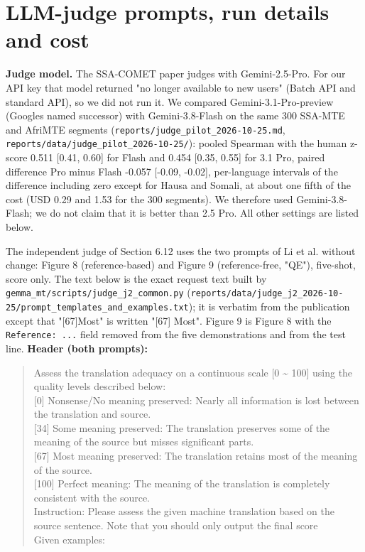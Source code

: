 \section{LLM-judge prompts, run details and cost}\label{llm-judge-prompts-run-details-and-cost}

\textbf{Judge model.} The SSA-COMET paper \citep{li2025ssacomet} judges with Gemini-2.5-Pro. For our API key that model returned "no longer available to new users" (Batch API and standard API), so we did not run it. We compared Gemini-3.1-Pro-preview (Google\textquotesingle s named successor) with Gemini-3.8-Flash on the same 300 SSA-MTE and AfriMTE segments (\texttt{reports/judge\_pilot\_2026-10-25.md}, \texttt{reports/data/judge\_pilot\_2026-10-25/}): pooled Spearman with the human z-score 0.511 {[}0.41, 0.60{]} for Flash and 0.454 {[}0.35, 0.55{]} for 3.1 Pro, paired difference Pro minus Flash -0.057 {[}-0.09, -0.02{]}, per-language intervals of the difference including zero except for Hausa and Somali, at about one fifth of the cost (USD 0.29 and 1.53 for the 300 segments). We therefore used Gemini-3.8-Flash; we do not claim that it is better than 2.5 Pro. All other settings are listed below.

The independent judge of Section 6.12 uses the two prompts of Li et al. \citep{li2025ssacomet} without change: Figure 8 (reference-based) and Figure 9 (reference-free, "QE"), five-shot, score only. The text below is the exact request text built by \texttt{gemma\_mt/scripts/judge\_j2\_common.py} (\texttt{reports/data/judge\_j2\_2026-10-25/prompt\_templates\_and\_examples.txt}); it is verbatim from the publication except that "{[}67{]}Most" is written "{[}67{]} Most". Figure 9 is Figure 8 with the \texttt{Reference:\ ...} field removed from the five demonstrations and from the test line. \textbf{Header (both prompts):}

\begin{quote}
Assess the translation adequacy on a continuous scale {[}0 \textasciitilde{} 100{]} using the quality levels described below:\\
{[}0{]} Nonsense/No meaning preserved: Nearly all information is lost between the translation and source.\\
{[}34{]} Some meaning preserved: The translation preserves some of the meaning of the source but misses significant parts.\\
{[}67{]} Most meaning preserved: The translation retains most of the meaning of the source.\\
{[}100{]} Perfect meaning: The meaning of the translation is completely consistent with the source.\\
Instruction: Please assess the given machine translation based on the source sentence. Note that you should only output the final score\\
Given examples:
\end{quote}

